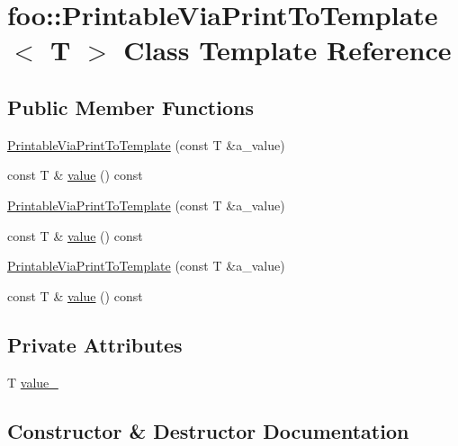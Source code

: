 \hypertarget{classfoo_1_1_printable_via_print_to_template}{}\section{foo\+::Printable\+Via\+Print\+To\+Template$<$ T $>$ Class Template Reference}
\label{classfoo_1_1_printable_via_print_to_template}
\subsection*{Public Member Functions}
\begin{DoxyCompactItemize}
\item 
\mbox{\hyperlink{classfoo_1_1_printable_via_print_to_template_a8fef9e8b59c9415624230b73469b517e}{Printable\+Via\+Print\+To\+Template}} (const T \&a\+\_\+value)
\item 
const T \& \mbox{\hyperlink{classfoo_1_1_printable_via_print_to_template_a14e0fcac9ae264e37e6212994b2920f6}{value}} () const
\item 
\mbox{\hyperlink{classfoo_1_1_printable_via_print_to_template_a8fef9e8b59c9415624230b73469b517e}{Printable\+Via\+Print\+To\+Template}} (const T \&a\+\_\+value)
\item 
const T \& \mbox{\hyperlink{classfoo_1_1_printable_via_print_to_template_a14e0fcac9ae264e37e6212994b2920f6}{value}} () const
\item 
\mbox{\hyperlink{classfoo_1_1_printable_via_print_to_template_a8fef9e8b59c9415624230b73469b517e}{Printable\+Via\+Print\+To\+Template}} (const T \&a\+\_\+value)
\item 
const T \& \mbox{\hyperlink{classfoo_1_1_printable_via_print_to_template_a14e0fcac9ae264e37e6212994b2920f6}{value}} () const
\end{DoxyCompactItemize}
\subsection*{Private Attributes}
\begin{DoxyCompactItemize}
\item 
T \mbox{\hyperlink{classfoo_1_1_printable_via_print_to_template_a7c6456772f6c908037b80d94f3367c63}{value\+\_\+}}
\end{DoxyCompactItemize}


\subsection{Constructor \& Destructor Documentation}
\mbox{\label{classfoo_1_1_printable_via_print_to_template_a8fef9e8b59c9415624230b73469b517e}} 
